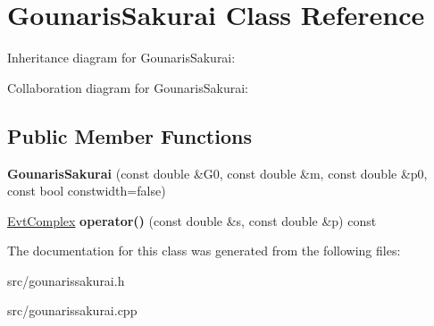 \hypertarget{class_gounaris_sakurai}{}\section{Gounaris\+Sakurai Class Reference}
\label{class_gounaris_sakurai}


Inheritance diagram for Gounaris\+Sakurai\+:


Collaboration diagram for Gounaris\+Sakurai\+:
\subsection*{Public Member Functions}
\begin{DoxyCompactItemize}
\item 
\hypertarget{class_gounaris_sakurai_a0975ba5b0bee880cad6ac596146e31a0}{}{\bfseries Gounaris\+Sakurai} (const double \&G0, const double \&m, const double \&p0, const bool constwidth=false)\label{class_gounaris_sakurai_a0975ba5b0bee880cad6ac596146e31a0}

\item 
\hypertarget{class_gounaris_sakurai_aec1d3015b0dab39defe8161222778f5e}{}\hyperlink{class_evt_complex}{Evt\+Complex} {\bfseries operator()} (const double \&s, const double \&p) const \label{class_gounaris_sakurai_aec1d3015b0dab39defe8161222778f5e}

\end{DoxyCompactItemize}


The documentation for this class was generated from the following files\+:\begin{DoxyCompactItemize}
\item 
src/gounarissakurai.\+h\item 
src/gounarissakurai.\+cpp\end{DoxyCompactItemize}
